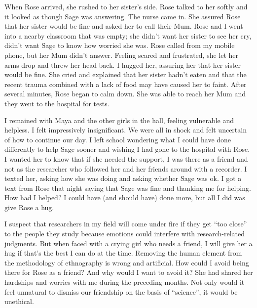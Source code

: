 When Rose arrived, she rushed to her sister's side.  Rose talked to her softly and it looked as though Sage was answering.  The nurse came in.  She assured Rose that her sister would be fine and asked her to call their Mum.  Rose and I went into a nearby classroom that was empty; she didn't want her sister to see her cry, didn't want Sage to know how worried she was.  Rose called from my mobile phone, but her Mum didn't answer.  Feeling scared and frustrated, she let her arms drop and threw her head back.  I hugged her, assuring her that her sister would be fine.  She cried and explained that her sister hadn't eaten and that the recent trauma combined with a lack of food may have caused her to faint.  After several minutes, Rose began to calm down.  She was able to reach her Mum and they went to the hospital for tests.  

I remained with Maya and the other girls in the hall, feeling vulnerable and helpless.  I felt impressively insignificant.  We were all in shock and felt uncertain of how to continue our day.  I left school wondering what I could have done differently to help Sage sooner and wishing I had gone to the hospital with Rose.  I wanted her to know that if she needed the support, I was there as a friend and not as the researcher who followed her and her friends around with a recorder.  I texted her, asking how she was doing and asking whether Sage was ok.  I got a text from Rose that night saying that Sage was fine and thanking me for helping.  How had I helped?  I could have (and should have) done more, but all I did was give Rose a hug.  

I suspect that researchers in my field will come under fire if they get ``too close'' to the people they study because emotions could interfere with research-related judgments.  But when faced with a crying girl who needs a friend, I will give her a hug if that's the best I can do at the time.  Removing the human element from the methodology of ethnography is wrong and artificial.    How could I avoid being there for Rose as a friend?  And why would I want to avoid it?  She had shared her hardships and worries with me during the preceding months.  Not only would it feel unnatural to dismiss our friendship on the basis of ``science'', it would be unethical.


